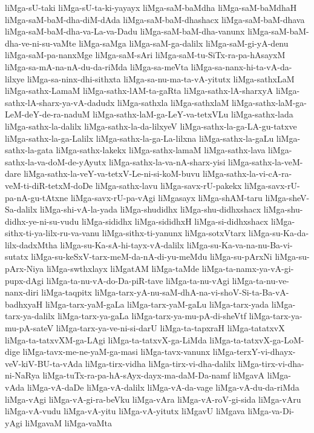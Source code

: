 {liMga-sU-taki
liMga-sU-ta-ki-yayayx
liMga-saM-baMdha
liMga-saM-baMdhaH
liMga-saM-baM-dha-diM-dAda
liMga-saM-baM-dhashacx
liMga-saM-baM-dhava
liMga-saM-baM-dha-va-La-va-Dadu
liMga-saM-baM-dha-vanunx
liMga-saM-baM-dha-ve-ni-su-vaMte
liMga-saMga
liMga-saM-ga-dalilx
liMga-saM-gi-yA-denu
liMga-saM-pa-nanxMge
liMga-saM-sAri
liMga-saM-tu-SiTx-ra-pa-hAsayxM
liMga-sa-mA-na-nA-du-da-riMda
liMga-sa-meVta
liMga-sa-nanx-hi-ta-vA-da-lilxye
liMga-sa-ninx-dhi-sithxta
liMga-sa-nu-ma-ta-vA-yitutx
liMga-sathxLaM
liMga-sathx-LamaM
liMga-sathx-lAM-ta-gaRta
liMga-sathx-lA-sharxyA
liMga-sathx-lA-sharx-ya-vA-dadudx
liMga-sathxla
liMga-sathxlaM
liMga-sathx-laM-ga-LeM-deY-de-ra-naduM
liMga-sathx-laM-ga-LeY-va-tetxVLu
liMga-sathx-lada
liMga-sathx-la-dalilx
liMga-sathx-la-da-lilxyeV
liMga-sathx-la-ga-LA-gu-tatxve
liMga-sathx-la-ga-Lalilx
liMga-sathx-la-ga-La-lilxna
liMga-sathx-la-gaLu
liMga-sathx-la-gata
liMga-sathx-lakekx
liMga-sathx-lamaM
liMga-sathx-lava
liMga-sathx-la-va-doM-de-yAyutx
liMga-sathx-la-va-nA-sharx-yisi
liMga-sathx-la-veM-dare
liMga-sathx-la-veY-va-tetxV-Le-ni-si-koM-buvu
liMga-sathx-la-vi-cA-ra-veM-ti-diR-tetxM-doDe
liMga-sathx-lavu
liMga-savx-rU-pakekx
liMga-savx-rU-pa-nA-gu-tAtxne
liMga-savx-rU-pa-vAgi
liMgasayx
liMga-shAM-taru
liMga-sheV-Sa-dalilx
liMga-shi-vA-la-yada
liMga-shudidhx
liMga-shu-didhxshacx
liMga-shu-didhx-ye-ni-su-vudu
liMga-sididhx
liMga-sididhxH
liMga-si-didhxshacx
liMga-sithx-ti-ya-lilx-ru-va-vanu
liMga-sithx-ti-yanunx
liMga-sotxVtarx
liMga-su-Ka-da-lilx-dadxMtha
liMga-su-Ka-sA-hi-tayx-vA-dalilx
liMga-su-Ka-va-na-nu-Ba-vi-sutatx
liMga-su-keSxV-tarx-meM-da-nA-di-yu-meMdu
liMga-su-pArxNi
liMga-su-pArx-Niya
liMga-swthxlayx
liMgatAM
liMga-taMde
liMga-ta-namx-ya-vA-gi-pupx-dAgi
liMga-ta-nu-vA-do-Da-piR-tave
liMga-ta-nu-vAgi
liMga-ta-nu-ve-nanx-diri
liMga-taqpitx
liMga-tarx-yA-nu-saM-dhA-na-vi-shoV-Si-ta-Ba-vA-badhxyaH
liMga-tarx-yaM-gaLa
liMga-tarx-yaM-gaLu
liMga-tarx-yada
liMga-tarx-ya-dalilx
liMga-tarx-ya-gaLa
liMga-tarx-ya-mu-pA-di-sheVtf
liMga-tarx-ya-mu-pA-sateV
liMga-tarx-ya-ve-ni-si-darU
liMga-ta-tapxraH
liMga-tatatxvX
liMga-ta-tatxvXM-ga-LAgi
liMga-ta-tatxvX-ga-LiMda
liMga-ta-tatxvX-ga-LoM-dige
liMga-tavx-me-ne-yaM-ga-masi
liMga-tavx-vanunx
liMga-terxY-vi-dhayx-veV-kiV-BU-ta-vAda
liMga-tirx-vidha
liMga-tirx-vi-dha-dalilx
liMga-tirx-vi-dha-ni-NaRya
liMga-tuTx-ra-pa-hA-sAyx-dayx-ma-daM-Da-namf
liMgavA
liMga-vAda
liMga-vA-daDe
liMga-vA-dalilx
liMga-vA-da-vage
liMga-vA-du-da-riMda
liMga-vAgi
liMga-vA-gi-ra-beVku
liMga-vAra
liMga-vA-roV-gi-sida
liMga-vAru
liMga-vA-vudu
liMga-vA-yitu
liMga-vA-yitutx
liMgavU
liMgava
liMga-va-Di-yAgi
liMgavaM
liMga-vaMta
}

